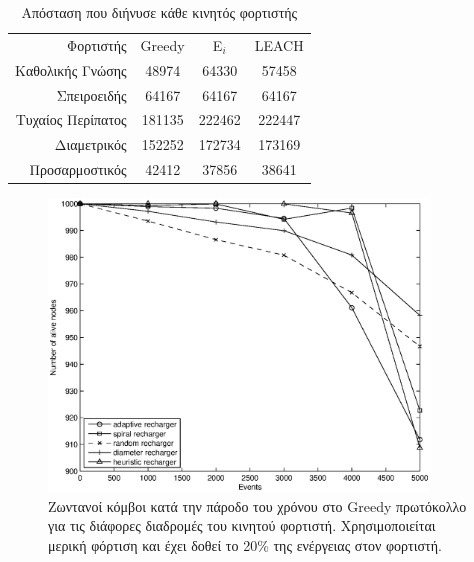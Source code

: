 \begin{table}[H]
\begin{tabular}{r|c|c|c|}
Φορτιστής & Greedy & E$_i$ & LEACH\\\cline{1-4}\cline{1-4}
Καθολικής Γνώσης & 48974 & 64330 & 57458\\\cline{1-4}
Σπειροειδής & 64167 & 64167 & 64167\\\cline{1-4}
Τυχαίος Περίπατος & 181135 & 222462 & 222447 \\\cline{1-4}
Διαμετρικός & 152252 & 172734 & 173169\\\cline{1-4}
Προσαρμοστικός & 42412 & 37856 & 38641\\\cline{1-4}
\end{tabular}
\caption{Απόσταση που διήνυσε κάθε κινητός φορτιστής}
\label{tab:dist}
\end{table}

\begin{figure}[H]
  \centering
  \includegraphics[width=0.9\textwidth]{experiments/classic/4.ourVSnaive/alive_nodes_greedy_rc_per_our-spiral-random-diameter-heuristic.eps}
  \caption{Ζωντανοί κόμβοι κατά την πάροδο του χρόνου στο Greedy πρωτόκολλο για τις διάφορες διαδρομές του κινητού φορτιστή. Χρησιμοποιείται μερική φόρτιση και έχει
δοθεί το 20\% της ενέργειας στον φορτιστή.}
  \label{fig:4exp_1_1}
\end{figure}

